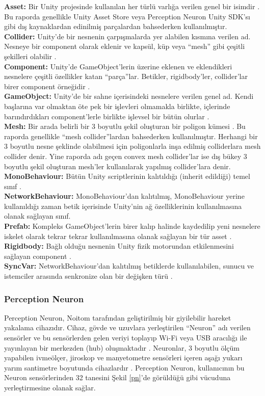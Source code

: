 \documentclass[a4paper, 12pt, titlepage]{article}
\begin{document}
\textbf{Asset:} Bir Unity projesinde kullanılan her türlü varlığa verilen genel bir isimdir \cite{asset}.
Bu raporda genellikle Unity Asset Store veya Perception Neuron Unity SDK’sı gibi dış
kaynaklardan edinilmiş parçalardan bahsederken kullanılmıştır. \\
\textbf{Collider:} Unity’de bir nesnenin çarpışmalarda yer alabilen kısmına verilen ad. Nesneye bir
component olarak eklenir ve kapsül, küp veya “mesh” gibi çeşitli şekilleri olabilir \cite{collider}.
\\
\textbf{Component:} Unity’de GameObject’lerin üzerine eklenen ve eklendikleri nesnelere çeşitli
özellikler katan “parça”lar. Betikler, rigidbody’ler, collider’lar birer component örneğidir \cite{component}.
\\
\textbf{GameObject:} Unity’de bir sahne içerisindeki nesnelere verilen genel ad. Kendi başlarına
var olmaktan öte pek bir işlevleri olmamakla birlikte, içlerinde barındırdıkları component’lerle
birlikte işlevsel bir bütün olurlar \cite{gameobject}. \\
\textbf{Mesh:} Bir arada belirli bir 3 boyutlu şekil oluşturan bir poligon kümesi \cite{mesh}. Bu
raporda genellikle “mesh collider”lardan bahsederken kullanılmıştır. Herhangi bir 3 boyutlu nesne
şeklinde olabilmesi için poligonlarla inşa edilmiş colliderlara mesh collider denir. Yine raporda
adı geçen convex mesh collider’lar ise dış bükey 3 boyutlu şekil oluşturan mesh’ler kullanılarak
yapılmış collider’lara denir. \\
\textbf{MonoBehaviour:} Bütün Unity scriptlerinin kalıtıldığı (inherit edildiği) temel sınıf \cite{monob}.
\\
\textbf{NetworkBehaviour:} MonoBehaviour’dan kalıtılmış, MonoBehaviour yerine kullanıldığı zaman
betik içerisinde Unity’nin ağ özelliklerinin kullanılmasına olanak sağlayan sınıf. \\
\textbf{Prefab:} Kompleks GameObject’lerin birer kalıp halinde kaydedilip yeni nesnelere iskelet
olarak tekrar tekrar kullanılmasına olanak sağlayan bir tür asset \cite{prefab}. \\
\textbf{Rigidbody:} Bağlı olduğu nesnenin Unity fizik motorundan etkilenmesini sağlayan component \cite{rigidb}.
 \\
\textbf{SyncVar:} NetworkBehaviour’dan kalıtılmış betiklerde kullanılabilen, sunucu ve istemciler
arasında senkronize olan bir değişken türü \cite{syncv}.  \\

\subsubsection{Perception Neuron}
Perception Neuron, Noitom tarafından geliştirilmiş bir giyilebilir hareket yakalama cihazıdır.
Cihaz, gövde ve uzuvlara yerleştirilen “Neuron” adı verilen sensörler ve bu sensörlerden gelen
veriyi toplayıp Wi-Fi veya USB aracılığı ile yayınlayan bir merkezden (hub) oluşmaktadır \cite{mocap}.
Neuronlar, 3 boyutlu ölçüm yapabilen ivmeölçer, jiroskop ve manyetometre sensörleri
içeren aşağı yukarı yarım santimetre boyutunda cihazlardır \cite{ebilgin}. Perception Neuron,
kullanıcının bu Neuron sensörlerinden 32 tanesini Şekil \ref{pn}'de görüldüğü gibi vücuduna
yerleştirmesine olanak sağlar.
\end{document}
